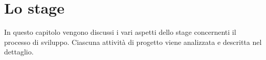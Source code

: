 
\chapter{Lo stage}
In questo capitolo vengono discussi i vari aspetti dello stage concernenti il processo di sviluppo.
Ciascuna attività di progetto viene analizzata e descritta nel dettaglio.

